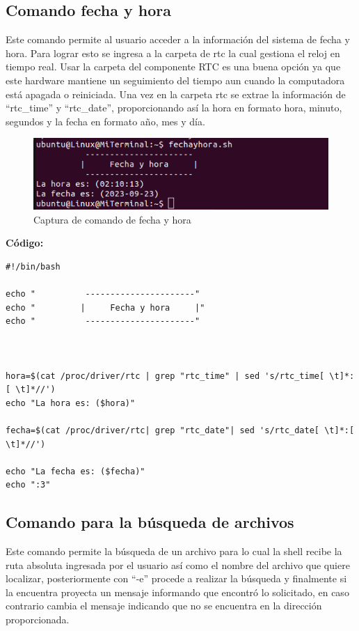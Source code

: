 \documentclass[12pt,a4paper]{article}
\begin{document}
\newpage
\subsection{Comando fecha y hora}
\noindent Este comando permite al usuario acceder a la información del sistema de fecha y hora. Para lograr esto se ingresa a la carpeta de rtc la cual gestiona el reloj en tiempo real. 
Usar la carpeta del componente RTC es una buena opción ya que este hardware mantiene un seguimiento del tiempo aun cuando la computadora está apagada o reiniciada. Una vez en la carpeta rtc se extrae la información de  “rtc\_time” y “rtc\_date”, proporcionando así la  hora en formato hora, minuto, segundos y la fecha en formato año, mes y día.

\begin{figure}[H]
    \centering
    \includegraphics[width=\textwidth]{img/fyh.png}
    \caption{Captura de comando de fecha y hora}
    \label{fyh}
\end{figure}

\textbf{Código:}
\begin{lstlisting}[style=BashInputStyle]
#!/bin/bash

echo "          ----------------------"
echo "         |     Fecha y hora     |"
echo "          ----------------------"



hora=$(cat /proc/driver/rtc | grep "rtc_time" | sed 's/rtc_time[ \t]*:[ \t]*//')
echo "La hora es: ($hora)"

fecha=$(cat /proc/driver/rtc| grep "rtc_date"| sed 's/rtc_date[ \t]*:[ \t]*//')

echo "La fecha es: ($fecha)"
echo ":3"
\end{lstlisting}

\newpage
\subsection{Comando para la búsqueda de archivos}
\noindent Este comando permite la búsqueda de un archivo para lo cual la shell recibe la ruta absoluta ingresada por el usuario así como el nombre del archivo que quiere localizar, posteriormente con “-e” procede a realizar la búsqueda y finalmente si la encuentra proyecta un mensaje informando que encontró lo solicitado, en caso contrario cambia el mensaje indicando que no se encuentra en la dirección proporcionada.
\end{document}
